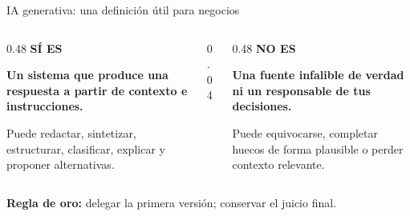 \documentclass[aspectratio=169,11pt]{beamer}
\newcommand{\kicker}[1]{{\color{gold}\scriptsize\bfseries\MakeUppercase{#1}}}
\newcommand{\muted}[1]{{\color{muted}#1}}
\begin{document}
\begin{frame}{IA generativa: una definición útil para negocios}
\begin{columns}[T,onlytextwidth]
\begin{column}{0.48\textwidth}
\kicker{Sí es}\par\vspace{0.25cm}
{\large\bfseries Un sistema que produce una respuesta a partir de contexto e instrucciones.}\par
\vspace{0.35cm}
\small Puede redactar, sintetizar, estructurar, clasificar, explicar y proponer alternativas.
\end{column}
\begin{column}{0.04\textwidth}
\centering{\color{soft}\rule{0.6pt}{4.7cm}}
\end{column}
\begin{column}{0.48\textwidth}
\kicker{No es}\par\vspace{0.25cm}
{\large\bfseries Una fuente infalible de verdad ni un responsable de tus decisiones.}\par
\vspace{0.35cm}
\small Puede equivocarse, completar huecos de forma plausible o perder contexto relevante.
\end{column}
\end{columns}

\vfill
{\color{forest}\bfseries Regla de oro:}\quad
\muted{delegar la primera versión; conservar el juicio final.}
\end{frame}
\end{document}

